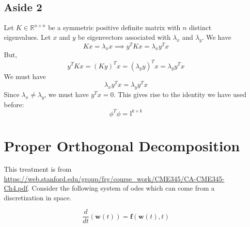 \documentclass{article}
\newcommand{\beq}{\begin{equation}}
\newcommand{\eeq}{\end{equation}}
\newcommand{\ber}{\begin{eqnarray}}
\newcommand{\eer}{\end{eqnarray}}
\newcommand{\dd}[2]{\frac{d}{d{#2}}{(#1)} }
\newcommand{\bw}{{\mathbf{w}}}
\newcommand{\bff}{\mathbf{f}}
\begin{document}
\subsection{Aside 2}
Let $K\in\mathbb{R}^{n\times{n}} $ be a symmetric positive definite matrix with $n$ distinct eigenvalues. Let $x$ and $y$ be eigenvectors associated with $\lambda_x$ and $\lambda_y$. We have
\beq
Kx=\lambda_xx \implies y^TKx = \lambda_xy^Tx
\eeq
But,
\beq
y^TKx = (Ky)^Tx = (\lambda_yy)^Tx = \lambda_yy^Tx
\eeq
We must have
\beq
\lambda_xy^Tx = \lambda_yy^Tx
\eeq
Since $\lambda_x\ne\lambda_y$, we must have $y^Tx=0$.
This gives rise to the identity we have used before:
\beq
\phi^T\phi = \mathbb{I}^{k\times{k}}
\eeq



\section{Proper Orthogonal Decomposition}
This treatment is from \url{https://web.stanford.edu/group/frg/course_work/CME345/CA-CME345-Ch4.pdf}. Consider the following system of odes which can come from a discretization in space.

\beq
\label{eqn:podgovern}
\dd{\bw(t)}{t} = \bff(\bw(t),t)
\eeq
\end{document}
